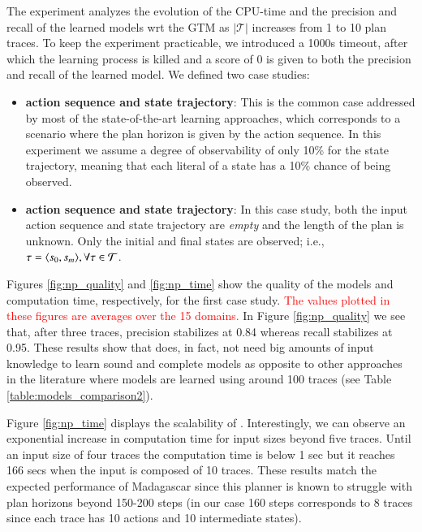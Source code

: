 The experiment analyzes the evolution of the CPU-time and the precision and recall of the learned models wrt the GTM as $|\mathcal{T}|$ increases from 1 to 10 plan traces. To keep the experiment practicable, we introduced a 1000s timeout, after which the learning process is killed and a score of $0$ is given to both the precision and recall of the learned model. We defined two case studies:

\begin{itemize}
	\item \textbf{\FO action sequence and \PO state trajectory}: This is the common case addressed by most of the state-of-the-art learning approaches, which corresponds to a scenario where the plan horizon is given by the action sequence. In this experiment we assume a degree of observability of only 10\% for the state trajectory, meaning that each literal of a state has a 10\% chance of being observed.
	\item  \textbf{\NO action sequence and \NO state trajectory}: In this case study, both the input action sequence and state trajectory are {\em empty} and the length of the plan is unknown. Only the initial and final states are observed; i.e., $\tau = {\langle s_0, s_m \rangle}, \forall \tau \in \mathcal{T}$.
\end{itemize}

Figures \ref{fig:np_quality} and \ref{fig:np_time} show the quality of the models and computation time, respectively, for the first case study. \textcolor{red}{The values plotted in these figures are averages over the 15 domains.} In Figure \ref{fig:np_quality} we see that, after three traces, precision stabilizes at 0.84 whereas recall stabilizes at 0.95. These results show that \FAMA does, in fact, not need big amounts of input knowledge to learn sound and complete models as opposite to other approaches in the literature where models are learned using around 100 traces (see Table \ref{table:models_comparison2}).

Figure \ref{fig:np_time} displays the scalability of \FAMA. Interestingly, we can observe an exponential increase in computation time for input sizes beyond five traces. Until an input size of four traces the computation time is below 1 sec but it reaches 166 secs when the input is composed of 10 traces. These results match the expected performance of {\sc Madagascar} since this planner is known to struggle with plan horizons beyond 150-200 steps (in our case 160 steps corresponds to 8 traces since each trace has 10 actions and 10 intermediate states).

